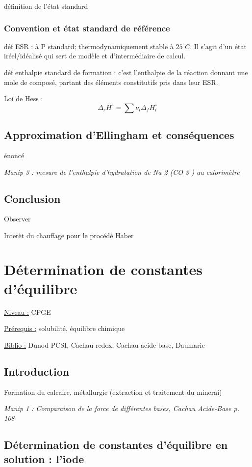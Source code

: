 \documentclass{article}%
\begin{document}
définition de l'état standard
\subsubsection{Convention et état standard de référence}

déf ESR : à P standard; thermodynamiquement stable à $25^\circ C$. Il s'agit d'un état iréel/idéalisé qui sert de modèle et d'intermédiaire de calcul.

déf enthalpie standard de formation : c'est l'enthalpie de la réaction donnant une mole de composé, partant des éléments constitutifs pris dans leur ESR.

Loi de Hess : \[\Delta_r H^\circ =\sum \nu_i \Delta_f H^\circ_i\]


\subsection{Approximation d'Ellingham et conséquences}
énoncé

\textit{Manip 3 : mesure de l’enthalpie d’hydratation de Na 2 (CO 3 ) au calorimètre}

\subsection{Conclusion}

Observer

Interêt du chauffage pour le procédé Haber

\section{Détermination de constantes d'équilibre}
\underline{Niveau :} CPGE 

\underline{Prérequis :} solubilité, équilibre chimique

\underline{Biblio :} Dunod PCSI, Cachau redox, Cachau acide-base, Daumarie

\subsection{Introduction}

Formation du calcaire, métallurgie (extraction et traitement du minerai)

\textit{Manip 1 : Comparaison de la force de différentes bases, Cachau Acide-Base p. 108}

\subsection{Détermination de constantes d'équilibre en solution : l'iode}
\end{document}
